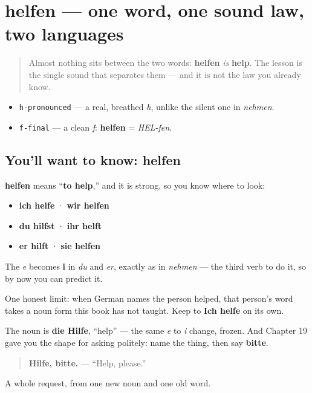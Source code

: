 \section[helfen]{helfen — one word, one sound law, two languages}

\label{lesson:GE-C25-helfen}



\begin{quote}
Almost nothing sits between the two words: \textbf{helfen} \emph{is} \textbf{help}. The lesson is the single sound that separates them — and it is not the law you already know.
\end{quote}

\begin{sounds}
\begin{itemize}
\raggedright
  \item \texttt{h-pronounced} — a real, breathed \emph{h}, unlike the silent one in \emph{nehmen}.
  \item \texttt{f-final} — a clean \emph{f}: \textbf{helfen} = \emph{HEL-fen}.
\end{itemize}
\end{sounds}

\subsection*{You'll want to know: helfen}
\textbf{helfen} means \textquotedblleft{}\textbf{to help},\textquotedblright{} and it is strong, so you know where to look:

\begin{itemize}
\raggedright
  \item \textbf{ich helfe} · \textbf{wir helfen}
  \item \textbf{du hilfst} · \textbf{ihr helft}
  \item \textbf{er hilft} · \textbf{sie helfen}
\end{itemize}

The \emph{e} becomes \textbf{i} in \emph{du} and \emph{er}, exactly as in \emph{nehmen} — the third verb to do it, so by now you can predict it.

One honest limit: when German names the person helped, that person's word takes a noun form this book has not taught. Keep to \textbf{Ich helfe} on its own.

\begin{culture}
The noun is \textbf{die Hilfe}, \textquotedblleft{}help\textquotedblright{} — the same \emph{e} to \emph{i} change, frozen. And Chapter 19 gave you the shape for asking politely: name the thing, then say \textbf{bitte}.

\begin{quote}
\textbf{Hilfe, bitte.} — \textquotedblleft{}Help, please.\textquotedblright{}
\end{quote}

A whole request, from one new noun and one old word.
\end{culture}

